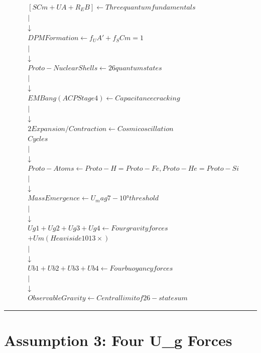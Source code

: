 \documentclass[12pt,a4paper]{article}
\begin{document}
\begin{equation}
\begin{aligned}
  & [SCm + UA + R_EB]            \leftarrow Three quantum fundamentals \\
  & | \\
  & \downarrow \\
  & DPM Formation              \leftarrow f_UA' + f_SCm = 1 \\
  & | \\
  & \downarrow \\
  & Proto-Nuclear Shells         \leftarrow 26 quantum states \\
  & | \\
  & \downarrow \\
  & EM Bang (ACP Stage 4)      \leftarrow Capacitance cracking \\
  & | \\
  & \downarrow \\
  & 2 Expansion/Contraction       \leftarrow Cosmic oscillation \\
  & Cycles \\
  & | \\
  & \downarrow \\
  & Proto-Atoms                 \leftarrow Proto-H=Proto-Fe, Proto-He=Proto-Si \\
  & | \\
  & \downarrow \\
  & Mass Emergence               \leftarrow U_mag 7-10° threshold \\
  & | \\
  & \downarrow \\
  & Ug1 + Ug2 + Ug3 + Ug4      \leftarrow Four gravity forces \\
  & + Um (Heaviside 1013\times) \\
  & | \\
  & \downarrow \\
  & Ub1 + Ub2 + Ub3 + Ub4      \leftarrow Four buoyancy forces \\
  & | \\
  & \downarrow \\
  & Observable Gravity           \leftarrow Central limit of 26-state sum
\end{aligned}
\end{equation}

\medskip\hrule\medskip

\section{Assumption 3: Four U\_g Forces}
\end{document}
